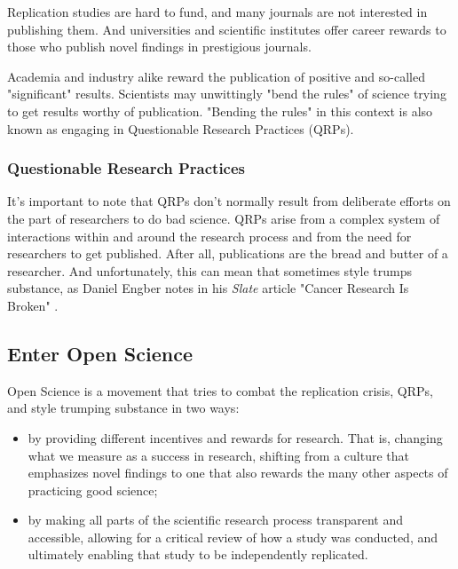 \documentclass[
]{book}
\providecommand{\tightlist}{%
  \setlength{\itemsep}{0pt}\setlength{\parskip}{0pt}}
\begin{document}
Replication studies are hard to fund, and many journals are not interested in publishing them. And universities and scientific institutes offer career rewards to those who publish novel findings in prestigious journals.

Academia and industry alike reward the publication of positive and so-called "significant" results. Scientists may unwittingly "bend the rules" of science trying to get results worthy of publication. "Bending the rules" in this context is also known as engaging in Questionable Research Practices (QRPs).

\hypertarget{questionable-research-practices}{%
\subsubsection*{Questionable Research Practices}\label{questionable-research-practices}}

It's important to note that QRPs don't normally result from deliberate efforts on the part of researchers to do bad science. QRPs arise from a complex system of interactions within and around the research process and from the need for researchers to get published. After all, publications are the bread and butter of a researcher. And unfortunately, this can mean that sometimes style trumps substance, as Daniel Engber notes in his \emph{Slate} article "Cancer Research Is Broken" \citep{engber_cancer_2016}.

\hypertarget{enter-open-science}{%
\subsection*{Enter Open Science}\label{enter-open-science}}

Open Science is a movement that tries to combat the replication crisis, QRPs, and style trumping substance in two ways:

\begin{itemize}
\tightlist
\item
  by providing different incentives and rewards for research. That is, changing what we measure as a success in research, shifting from a culture that emphasizes novel findings to one that also rewards the many other aspects of practicing good science;
\item
  by making all parts of the scientific research process transparent and accessible, allowing for a critical review of how a study was conducted, and ultimately enabling that study to be independently replicated.
\end{itemize}
\end{document}
